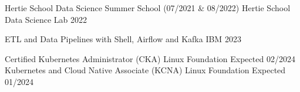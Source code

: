 

\begin{cvhonors}
  \cvhonor
    {Hertie School Data Science Summer School (07/2021 \& 08/2022)} %
    {Hertie School Data Science Lab} %
    {} %
    {2022} %

  \cvhonor
    {ETL and Data Pipelines with Shell, Airflow and Kafka} %
    {IBM} %
    {} %
    {2023} %

  \cvhonor
    {Certified Kubernetes Administrator (CKA)} %
    {Linux Foundation} %
    {} %
    {Expected 02/2024} %
  \cvhonor
    {Kubernetes and Cloud Native Associate (KCNA)} %
    {Linux Foundation} %
    {} %
    {Expected 01/2024} %

\end{cvhonors}
